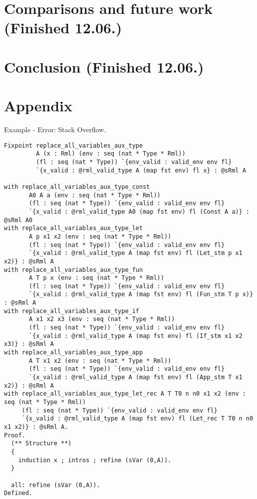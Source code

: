 \documentclass[11pt, leqno, titlepage]{article}
\theoremstyle{definition}
\begin{document}
\section{Comparisons and future work (Finished 12.06.)}


\section{Conclusion (Finished 12.06.)}



\newpage
\section{Appendix}
Example - Error: Stack Overflow.
\begin{lstlisting}[language=coq]
Fixpoint replace_all_variables_aux_type
         A (x : Rml) (env : seq (nat * Type * Rml))
         (fl : seq (nat * Type)) `{env_valid : valid_env env fl}
         `{x_valid : @rml_valid_type A (map fst env) fl x} : @sRml A
                                                                            
with replace_all_variables_aux_type_const
       A0 A a (env : seq (nat * Type * Rml))
       (fl : seq (nat * Type)) `{env_valid : valid_env env fl}
       `{x_valid : @rml_valid_type A0 (map fst env) fl (Const A a)} : @sRml A0
with replace_all_variables_aux_type_let
       A p x1 x2 (env : seq (nat * Type * Rml))
       (fl : seq (nat * Type)) `{env_valid : valid_env env fl}
       `{x_valid : @rml_valid_type A (map fst env) fl (Let_stm p x1 x2)} : @sRml A
with replace_all_variables_aux_type_fun
       A T p x (env : seq (nat * Type * Rml))
       (fl : seq (nat * Type)) `{env_valid : valid_env env fl}
       `{x_valid : @rml_valid_type A (map fst env) fl (Fun_stm T p x)} : @sRml A
with replace_all_variables_aux_type_if
       A x1 x2 x3 (env : seq (nat * Type * Rml))
       (fl : seq (nat * Type)) `{env_valid : valid_env env fl}
       `{x_valid : @rml_valid_type A (map fst env) fl (If_stm x1 x2 x3)} : @sRml A
with replace_all_variables_aux_type_app
       A T x1 x2 (env : seq (nat * Type * Rml))
       (fl : seq (nat * Type)) `{env_valid : valid_env env fl}
       `{x_valid : @rml_valid_type A (map fst env) fl (App_stm T x1 x2)} : @sRml A
with replace_all_variables_aux_type_let_rec A T T0 n n0 x1 x2 (env : seq (nat * Type * Rml))
     (fl : seq (nat * Type)) `{env_valid : valid_env env fl}
     `{x_valid : @rml_valid_type A (map fst env) fl (Let_rec T T0 n n0 x1 x2)} : @sRml A.
Proof.
  (** Structure **)
  {
    induction x ; intros ; refine (sVar (0,A)).
  }
  
  all: refine (sVar (0,A)).  
Defined.
\end{lstlisting}
\end{document}
